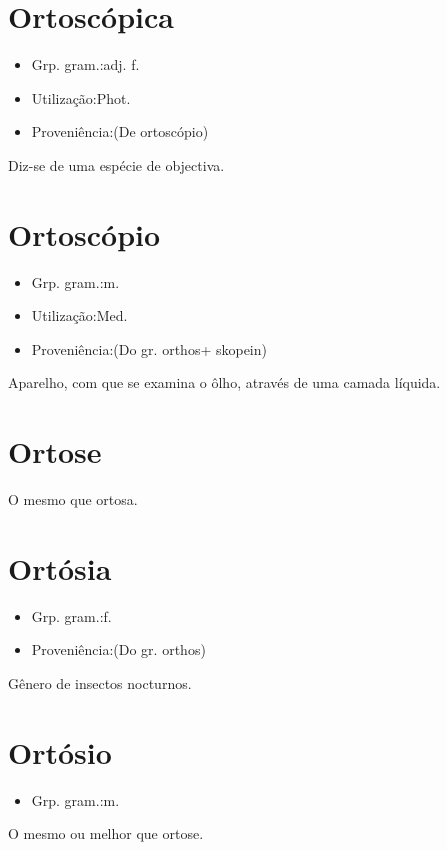 \section{Ortoscópica}
\begin{itemize}
\item {Grp. gram.:adj. f.}
\end{itemize}
\begin{itemize}
\item {Utilização:Phot.}
\end{itemize}
\begin{itemize}
\item {Proveniência:(De \textunderscore ortoscópio\textunderscore )}
\end{itemize}
Diz-se de uma espécie de objectiva.
\section{Ortoscópio}
\begin{itemize}
\item {Grp. gram.:m.}
\end{itemize}
\begin{itemize}
\item {Utilização:Med.}
\end{itemize}
\begin{itemize}
\item {Proveniência:(Do gr. \textunderscore orthos\textunderscore  + \textunderscore skopein\textunderscore )}
\end{itemize}
Aparelho, com que se examina o ôlho, através de uma camada líquida.
\section{Ortose}
O mesmo que \textunderscore ortosa\textunderscore .
\section{Ortósia}
\begin{itemize}
\item {Grp. gram.:f.}
\end{itemize}
\begin{itemize}
\item {Proveniência:(Do gr. \textunderscore orthos\textunderscore )}
\end{itemize}
Gênero de insectos nocturnos.
\section{Ortósio}
\begin{itemize}
\item {Grp. gram.:m.}
\end{itemize}
O mesmo ou melhor que \textunderscore ortose\textunderscore .
